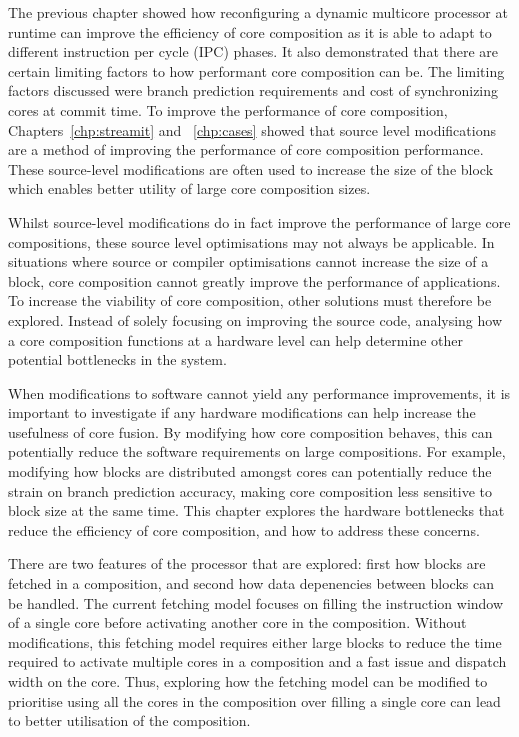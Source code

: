 The previous chapter showed how reconfiguring a dynamic multicore processor at runtime can improve the efficiency of core composition as it is able to adapt to different instruction per cycle (IPC) phases.
It also demonstrated that there are certain limiting factors to how performant core composition can be.
The limiting factors discussed were branch prediction requirements and cost of synchronizing cores at commit time.
To improve the performance of core composition, Chapters~\ref{chp:streamit} and ~\ref{chp:cases} showed that source level modifications are a method of improving the performance of core composition performance.
These source-level modifications are often used to increase the size of the block which enables better utility of large core composition sizes.

Whilst source-level modifications do in fact improve the performance of large core compositions, these source level optimisations may not always be applicable.
In situations where source or compiler optimisations cannot increase the size of a block, core composition cannot greatly improve the performance of applications.
To increase the viability of core composition, other solutions must therefore be explored.
Instead of solely focusing on improving the source code, analysing how a core composition functions at a hardware level can help determine other potential bottlenecks in the system.

When modifications to software cannot yield any performance improvements, it is important to investigate if any hardware modifications can help increase the usefulness of core fusion.
By modifying how core composition behaves, this can potentially reduce the software requirements on large compositions.
For example, modifying how blocks are distributed amongst cores can potentially reduce the strain on branch prediction accuracy, making core composition less sensitive to block size at the same time.
This chapter explores the hardware bottlenecks that reduce the efficiency of core composition, and how to address these concerns.

There are two features of the processor that are explored: first how blocks are fetched in a composition, and second how data depenencies between blocks can be handled.
The current fetching model focuses on filling the instruction window of a single core before activating another core in the composition.
Without modifications, this fetching model requires either large blocks to reduce the time required to activate multiple cores in a composition and a fast issue and dispatch width on the core.
Thus, exploring how the fetching model can be modified to prioritise using all the cores in the composition over filling a single core can lead to better utilisation of the composition.

